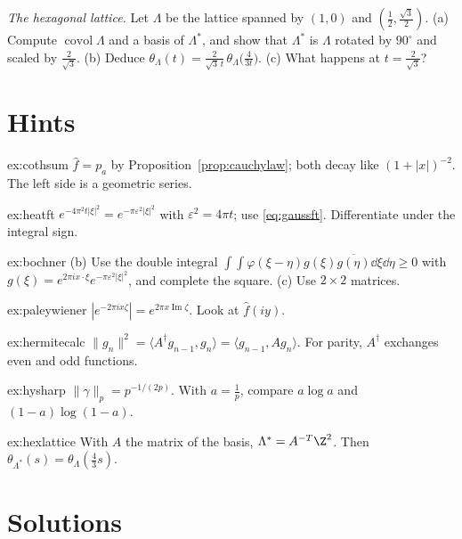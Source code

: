 \begin{exercise}[$\star\star$]\label{ex:hexlattice}
\emph{The hexagonal lattice.} Let $\Lambda$ be the lattice spanned by $(1,0)$ and $(\frac12,\frac{\sqrt3}2)$. (a) Compute $\operatorname{covol}\Lambda$ and a basis of $\Lambda^*$, and show that $\Lambda^*$ is $\Lambda$ rotated by
$90^\circ$ and scaled by $\frac2{\sqrt3}$. (b) Deduce $\theta_\Lambda(t)=\frac2{\sqrt3\,t}\,\theta_\Lambda\bigl(\frac4{3t}\bigr)$. (c) What happens at $t=\frac2{\sqrt3}$?
\end{exercise}

\section{Hints}

\begin{hint}{ex:cothsum}
$\hat f=p_a$ by Proposition~\ref{prop:cauchylaw}; both decay like $(1+|x|)^{-2}$. The left side is a geometric series.
\end{hint}
\begin{hint}{ex:heatft}
$e^{-4\pi^2t|\xi|^2}=e^{-\pi\varepsilon^2|\xi|^2}$ with $\varepsilon^2=4\pi t$; use \eqref{eq:gaussft}. Differentiate under the integral sign.
\end{hint}
\begin{hint}{ex:bochner}
(b) Use the double integral $\int\!\!\int\varphi(\xi-\eta)g(\xi)\overline{g(\eta)}\dd\xi\dd\eta\ge0$ with $g(\xi)=e^{2\pi ix\cdot\xi}e^{-\pi\varepsilon^2|\xi|^2}$, and complete the square. (c) Use $2\times2$ matrices.
\end{hint}
\begin{hint}{ex:paleywiener}
$|e^{-2\pi ix\zeta}|=e^{2\pi x\operatorname{Im}\zeta}$. Look at $\hat f(iy)$.
\end{hint}
\begin{hint}{ex:hermitecalc}
$\|g_n\|^2=\langle A^\dagger g_{n-1},g_n\rangle=\langle g_{n-1},Ag_n\rangle$. For parity, $A^\dagger$ exchanges even and odd functions.
\end{hint}
\begin{hint}{ex:hysharp}
$\|\gamma\|_p=p^{-1/(2p)}$. With $a=\frac1p$, compare $a\log a$ and $(1-a)\log(1-a)$.
\end{hint}
\begin{hint}{ex:hexlattice}
With $A$ the matrix of the basis, $\Lambda^*=A^{-T}\Z^2$. Then $\theta_{\Lambda^*}(s)=\theta_\Lambda(\frac43s)$.
\end{hint}

\section{Solutions}

